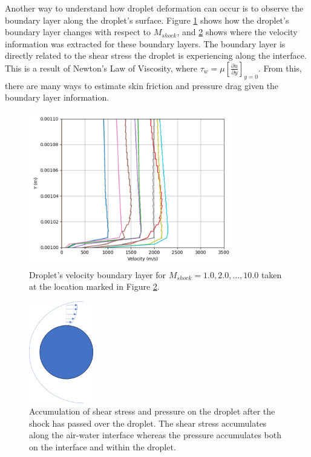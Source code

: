 \documentclass{UCF_ETD}
\begin{document}
Another way to understand how droplet deformation can occur is to observe the boundary layer along the droplet's surface.
Figure \ref{fig:boundary_layer_v_Mach} shows how the droplet's boundary layer changes with respect to $M_{shock}$, and \ref{fig:BL_diagram} shows where the velocity information was extracted for these boundary layers.
The boundary layer is directly related to the shear stress the droplet is experiencing along the interface. 
This is a result of Newton's Law of Viscosity, where $\tau_{w} = \mu \left[\frac{\partial u}{\partial y}\right]_{y=0}$. 
From this, there are many ways to estimate skin friction and pressure drag given the boundary layer information. 

\begin{figure}
    \centering
    \includegraphics[width=0.8\textwidth]{Figures/coplotted_BLs.png}
    \caption{Droplet's velocity boundary layer for $M_{shock} = 1.0, 2.0,...,10.0$ taken at the location marked in Figure \ref{fig:BL_diagram}.}
    \label{fig:boundary_layer_v_Mach}
\end{figure}

\begin{figure}
    \centering
    \includegraphics[width=0.25\textwidth]{Figures/BL_diagram.png}
    \caption{Accumulation of shear stress and pressure on the droplet after the shock has passed over the droplet. The shear stress accumulates along the air-water interface whereas the pressure accumulates both on the interface and within the droplet.}
    \label{fig:BL_diagram}
\end{figure}
\end{document}
